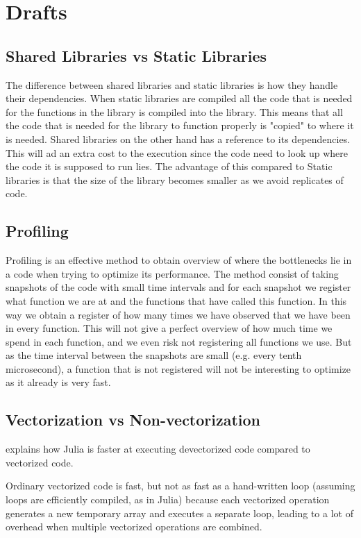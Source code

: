 \chapter{Drafts}
\section{Shared Libraries vs Static Libraries}
The difference between shared libraries and static libraries is how they handle their dependencies. When static libraries are compiled all the code that is needed for the functions in the library is compiled into the library. This means that all the code that is needed for the library to function properly is "copied" to where it is needed. Shared libraries on the other hand has a reference to its dependencies. This will ad an extra cost to the execution since the code need to look up where the code it is supposed to run lies. The advantage of this compared to Static libraries is that the size of the library becomes smaller as we avoid replicates of code.

\section{Profiling}
Profiling is an effective method to obtain overview of where the bottlenecks lie in a code when trying to optimize its performance. The method consist of taking snapshots of the code with small time intervals and for each snapshot we register what function we are at and the functions that have called this function. In this way we obtain a register of how many times we have observed that we have been in every function. This will not give a perfect overview of how much time we spend in each function, and we even risk not registering all functions we use. But as the time interval between the snapshots are small (e.g. every tenth microsecond), a function that is not registered will not be interesting to optimize as it already is very fast. 

\section{Vectorization vs Non-vectorization}
\emph{\citep{Vectorization}} explains how Julia is faster at executing devectorized code compared to vectorized code.

\emph{\citep{MoreDotsJuliaBlog}}
Ordinary vectorized code is fast, but not as fast as a hand-written loop (assuming loops are efficiently compiled, as in Julia) because each vectorized operation generates a new temporary array and executes a separate loop, leading to a lot of overhead when multiple vectorized operations are combined.
